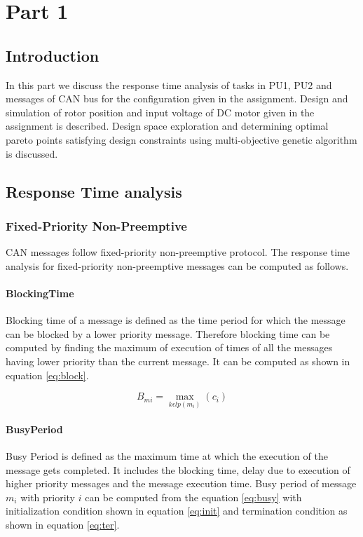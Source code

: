 \chapter{Part 1}

\section{Introduction}
In this part we discuss the response time analysis of tasks in PU1, PU2 and messages of CAN bus for the configuration given in the assignment. Design and simulation of rotor position and input voltage of DC motor given in the assignment is described. Design space exploration and determining optimal pareto points satisfying design constraints using multi-objective genetic algorithm is discussed.

\section{Response Time analysis}
\subsection{Fixed-Priority Non-Preemptive}
CAN messages follow fixed-priority non-preemptive protocol. The response time analysis for fixed-priority non-preemptive messages can be computed as follows.

\subsubsection{BlockingTime}
Blocking time of a message is defined as the time period for which the message can be blocked by a lower priority message. Therefore blocking time can be computed by finding the maximum of execution of times of all the messages having lower priority than the current message. It can be computed as shown in equation \ref{eq:block}.

\begin{equation}
B_{mi}=\max_{k\epsilon lp(m_i)}(c_i) 
\label{eq:block}
\end{equation}

\subsubsection{BusyPeriod}
Busy Period is defined as the maximum time at which the execution of the message gets completed. It includes the blocking time, delay due to execution of higher priority messages and the message execution time. Busy period of message $m_i$ with priority $i$ can be computed from the equation \ref{eq:busy} with initialization condition shown in equation \ref{eq:init} and termination condition as shown in equation \ref{eq:ter}. 

